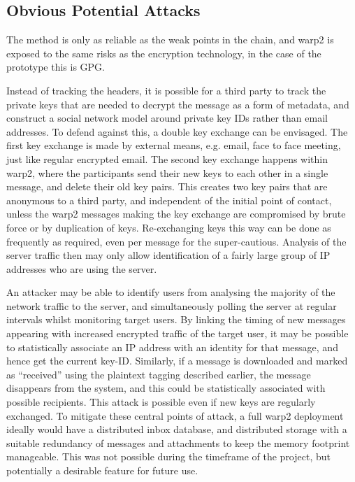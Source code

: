 \pdfoutput=1 \documentclass{article}
\begin{document}
\subsection{Obvious Potential Attacks}
The method is only as reliable as the weak points in the chain, and warp2 is exposed to the same risks as the encryption technology, in the case of the prototype this is GPG.

Instead of tracking the headers, it is possible for a third party to track the private keys that are needed to decrypt the message as a form of metadata, and construct a social network model around private key IDs rather than email addresses.  To defend against this, a double key exchange can be envisaged.  The first key exchange is made by external means, e.g. email, face to face meeting, just like regular encrypted email.  The second key exchange happens within warp2, where the participants send their new keys to each other in a single message, and delete their old key pairs.  This creates two key pairs that are anonymous to a third party, and independent of the initial point of contact, unless the warp2 messages making the key exchange are compromised by brute force or by duplication of keys.  Re-exchanging keys this way can be done as frequently as required, even per message for the super-cautious.  Analysis of the server traffic then may only allow identification of a fairly large group of IP addresses who are using the server.

An attacker may be able to identify users from analysing the majority of the network traffic to the server, and simultaneously polling the server at regular intervals whilst monitoring target users.  By linking the timing of new messages appearing with increased encrypted traffic of the target user, it may be possible to statistically associate an IP address with an identity for that message, and hence get the current key-ID.  Similarly, if a message is downloaded and marked as ``received'' using the plaintext tagging described earlier, the message disappears from the system, and this could be statistically associated with possible recipients.  This attack is possible even if new keys are regularly exchanged.  To mitigate these central points of attack, a full warp2 deployment ideally would have a distributed inbox database, and distributed storage with a suitable redundancy of messages and attachments to keep the memory footprint manageable.  This was not possible during the timeframe of the project, but potentially a desirable feature for future use.
\end{document}
